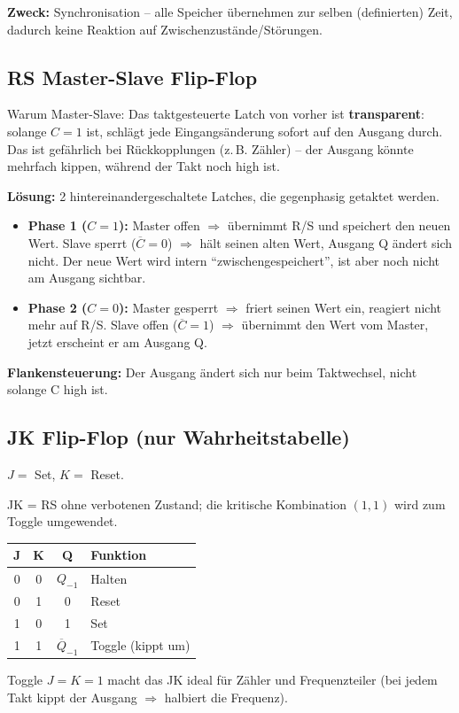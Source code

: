 \documentclass[11pt,a4paper]{article}
\begin{document}
\textbf{Zweck:} Synchronisation -- alle Speicher übernehmen zur selben (definierten) Zeit, dadurch keine Reaktion auf Zwischenzustände/Störungen.

\subsection{RS Master-Slave Flip-Flop}
Warum Master-Slave: Das taktgesteuerte Latch von vorher ist \textbf{transparent}: solange $C = 1$ ist, schlägt jede Eingangsänderung sofort auf den Ausgang durch. Das ist gefährlich bei Rückkopplungen (z.\,B. Zähler) -- der Ausgang könnte mehrfach kippen, während der Takt noch high ist.

\textbf{Lösung:} 2 hintereinandergeschaltete Latches, die gegenphasig getaktet werden.
\begin{itemize}
    \item \textbf{Phase 1 ($C=1$):} Master offen $\Rightarrow$ übernimmt R/S und speichert den neuen Wert. Slave sperrt ($\overline{C}=0$) $\Rightarrow$ hält seinen alten Wert, Ausgang Q ändert sich nicht. Der neue Wert wird intern ``zwischengespeichert'', ist aber noch nicht am Ausgang sichtbar.
    \item \textbf{Phase 2 ($C=0$):} Master gesperrt $\Rightarrow$ friert seinen Wert ein, reagiert nicht mehr auf R/S. Slave offen ($\overline{C}=1$) $\Rightarrow$ übernimmt den Wert vom Master, jetzt erscheint er am Ausgang Q.
\end{itemize}
\textbf{Flankensteuerung:} Der Ausgang ändert sich nur beim Taktwechsel, nicht solange C high ist.

\subsection{JK Flip-Flop (nur Wahrheitstabelle)}
$J =$ Set, $K =$ Reset.

JK = RS ohne verbotenen Zustand; die kritische Kombination $(1,1)$ wird zum Toggle umgewendet.
\begin{center}
\begin{tabular}{cc|cl}
    \toprule
    J & K & Q & Funktion \\ \midrule
    0 & 0 & $Q_{-1}$ & Halten \\
    0 & 1 & 0 & Reset \\
    1 & 0 & 1 & Set \\
    1 & 1 & $\overline{Q}_{-1}$ & Toggle (kippt um) \\ \bottomrule
\end{tabular}
\end{center}
Toggle $J=K=1$ macht das JK ideal für Zähler und Frequenzteiler (bei jedem Takt kippt der Ausgang $\Rightarrow$ halbiert die Frequenz).
\end{document}
